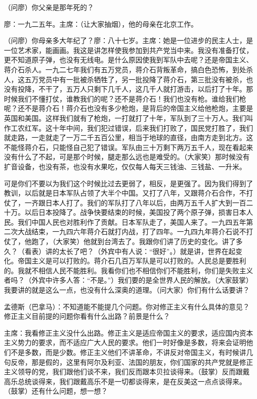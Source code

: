 （问廖）你父亲是那年死的？

廖：一九二五年。主席：（让大家抽烟），他的母亲在北京工作。

（问廖）你母亲多大年纪了？廖：八十七岁。主席：她是一位进步的民主人士，是一位艺术家，能画画。我这是讲怎样使我参加到共产党当中来。我没有准备打仗，更不知道原子弹，也没有无线电。是什么原因使我到军队中去呢？还是帝国主义、蒋介石杀人。一九二七年我们有五万党员，蒋介石背叛革命，搞白色恐怖，到处杀人，这五万党员中有一批被杀牺牲了，另一批投降了蒋介石，第三批没有被杀，也没有投降，不干了，五万人只剩下几千人，这几千人就打游击，以后打了十年。那时候我们不懂打仗，谁教我们的呢？还不是蒋介石！我们也没有枪。谁给我们枪呢？还不是蒋介石！蒋介石也没有多少枪炮，是背后的帝国主义给他枪炮，主要是英国和美国。这样我们就有了枪炮，一打就打了十年，军队到了三十万人。我们叫作工农红军。这十年中间，我们犯过错误，后来我们打败了，国民党打胜了，我们就走路，一走就走了一万二千五百公里，相当于地球的直径，由南方走到北方。这不能怪蒋介石，只能怪自己犯了错误。军队由三十万剩下两万五千人，现在看起来没有什么了不起，可是那个时候，腿走那么远也是难受的。（大家笑）那时候没有扩音设备，也没有茶，也没有水果吃，仅仅每人每天三钱油、三钱盐、一升米。

可是你们不要以为我们这个时候比过去更弱了，相反，是更强了。因为我们得到了教训，以后就是日本军队占领了大半个中国。又打了八年，又跟蒋介石合作，不打仗了，一齐跟日本人打了。我们的军队打了八年以后，由两万五千人扩大到一百二十万。以后日本投降了。战争快要结束的时候，美国投了两个原子弹，损害日本人民。我们中国人民也对胜利作了贡献。日本军队走了，美国人来了。一九四五年第二次大战结束，一九四六年蒋介石就打内战，打了四年。一九四九年蒋介石说不打仗了，他跑了，（大家笑）他就到台湾去了。我跟你们讲了历史的变化。讲了多久？（看表）讲的太长了吧？（外宾中有人说：“很好”。）就是讲，世界在起变化。帝国主义是可以打败的。蒋介石几百万军队是可以打败的。人民总是要胜利的。我就不相信人民不能胜利。我看你们也不相信你们不能胜利，你们是失败主义者吗？（外宾中许多人答：“不是。”）我们要的是全世界人民的解放。（大家鼓掌）我要讲的就是这么一点，也没有什么深奥的道理。（问大家）你们有什么话要讲？

孟德斯（巴拿马）：不知道能不能提几个问题。你对修正主义有什么具体的意见？修正主义目前提的问题你看有什么出路？前景是什么？

主席：我看修正主义没什么出路。修正主义是适应帝国主义的要求，适应国内资本主义势力的要求，而不适应广大人民的要求。他们一时好像是多数，将来会证明他们不是多数，而是少数。修正主义他们不讲革命，不讲反对帝国主义，有时候讲几句反帝，那是假的，这里有阿尔及利亚、法国的朋友，你们国家的共产党就是修正主义领导的党，我们跟他们谈不来，我们反而跟本贝拉谈得来。（鼓掌）反而跟戴高乐总统谈得来，我们跟戴高乐不是一切都谈得来，是在反美这一点点谈得来。（鼓掌）还有什么问题，想一想？

